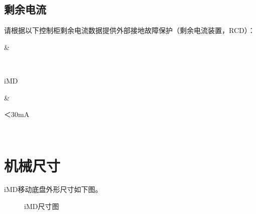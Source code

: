 \documentclass[a4paper,11pt,english,openany,oneside]{sphinxmanual}
\renewcommand{\sphinxstyletheadfamily}{
\color{white}\bfseries
}
\begin{document}
\subsection{剩余电流}
\label{\detokenize{07 _u6280_u672f_u89c4_u683c:id12}}\label{\detokenize{07 _u6280_u672f_u89c4_u683c:id13}}
\sphinxAtStartPar
请根据以下控制柜剩余电流数据提供外部接地故障保护（剩余电流装置，RCD）：


\begin{savenotes}\sphinxattablestart
\sphinxthistablewithglobalstyle
\centering
{}
\sphinxthecaptionisattop
{}\label{\detokenize{07 _u6280_u672f_u89c4_u683c:id49}}
\sphinxaftertopcaption
\begin{tabular}[t]{}
\sphinxtoprule
\begin{varwidth}[t]{}
\sphinxstyletheadfamily \sphinxAtStartPar
{}
\sphinxbeforeendvarwidth
\end{varwidth}%
&\begin{varwidth}[t]{}
\sphinxstyletheadfamily \sphinxAtStartPar
{}
\sphinxbeforeendvarwidth
\end{varwidth}%
\\
\sphinxmidrule
\sphinxtableatstartofbodyhook\begin{varwidth}[t]{}
\sphinxAtStartPar
iM\sphinxhyphen{}D
\sphinxbeforeendvarwidth
\end{varwidth}%
&\begin{varwidth}[t]{}
\sphinxAtStartPar
＜30mA
\sphinxbeforeendvarwidth
\end{varwidth}%
\\
\sphinxbottomrule
\end{tabular}
\sphinxtableafterendhook\par
\sphinxattableend\end{savenotes}


\section{机械尺寸}
\label{\detokenize{07 _u6280_u672f_u89c4_u683c:id14}}\label{\detokenize{07 _u6280_u672f_u89c4_u683c:id15}}
\sphinxAtStartPar
iM\sphinxhyphen{}D移动底盘外形尺寸如下图。

\begin{figure}[H]
\centering
\capstart

\noindent{}
\caption{iM\sphinxhyphen{}D尺寸图}\label{\detokenize{07 _u6280_u672f_u89c4_u683c:id50}}\end{figure}
\end{document}
